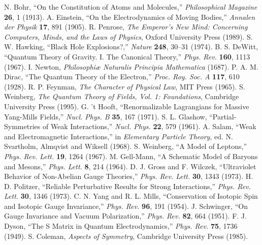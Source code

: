 \documentclass[12pt]{article}
\begin{document}
\begin{thebibliography}{33}
 N. Bohr, ``On the Constitution of Atoms and Molecules,'' \textit{Philosophical Magazine} \textbf{26}, 1 (1913).
 A. Einstein, ``On the Electrodynamics of Moving Bodies,'' \textit{Annalen der Physik} \textbf{17}, 891 (1905).
 R. Penrose, \textit{The Emperor's New Mind: Concerning Computers, Minds, and the Laws of Physics}, Oxford University Press (1989).
 S. W. Hawking, ``Black Hole Explosions?,'' \textit{Nature} \textbf{248}, 30--31 (1974).
 B. S. DeWitt, ``Quantum Theory of Gravity. I. The Canonical Theory,'' \textit{Phys. Rev.} \textbf{160}, 1113 (1967).
 I. Newton, \textit{Philosophi\ae{} Naturalis Principia Mathematica} (1687).
 P. A. M. Dirac, ``The Quantum Theory of the Electron,'' \textit{Proc. Roy. Soc. A} \textbf{117}, 610 (1928).
 R. P. Feynman, \textit{The Character of Physical Law}, MIT Press (1965).
 S. Weinberg, \textit{The Quantum Theory of Fields, Vol. 1: Foundations}, Cambridge University Press (1995).
 G. 't Hooft, ``Renormalizable Lagrangians for Massive Yang-Mills Fields,'' \textit{Nucl. Phys. B} \textbf{35}, 167 (1971).
 S. L. Glashow, ``Partial-Symmetries of Weak Interactions,'' \textit{Nucl. Phys.} \textbf{22}, 579 (1961).
 A. Salam, ``Weak and Electromagnetic Interactions,'' in \textit{Elementary Particle Theory}, ed. N. Svartholm, Almqvist and Wiksell (1968).
 S. Weinberg, ``A Model of Leptons,'' \textit{Phys. Rev. Lett.} \textbf{19}, 1264 (1967).
 M. Gell-Mann, ``A Schematic Model of Baryons and Mesons,'' \textit{Phys. Lett.} \textbf{8}, 214 (1964).
 D. J. Gross and F. Wilczek, ``Ultraviolet Behavior of Non-Abelian Gauge Theories,'' \textit{Phys. Rev. Lett.} \textbf{30}, 1343 (1973).
 H. D. Politzer, ``Reliable Perturbative Results for Strong Interactions,'' \textit{Phys. Rev. Lett.} \textbf{30}, 1346 (1973).
 C. N. Yang and R. L. Mills, ``Conservation of Isotopic Spin and Isotopic Gauge Invariance,'' \textit{Phys. Rev.} \textbf{96}, 191 (1954).
 J. Schwinger, ``On Gauge Invariance and Vacuum Polarization,'' \textit{Phys. Rev.} \textbf{82}, 664 (1951).
 F. J. Dyson, ``The S Matrix in Quantum Electrodynamics,'' \textit{Phys. Rev.} \textbf{75}, 1736 (1949).
 S. Coleman, \textit{Aspects of Symmetry}, Cambridge University Press (1985).

\end{thebibliography}
\end{document}
